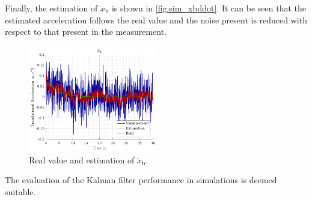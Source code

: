 Finally, the estimation of $\ddot{x}_\mathrm{b}$ is shown in \autoref{fig:sim_xbddot}. It can be seen that the estimated acceleration follows the real value and the noise present is reduced with respect to that present in the measurement.
\begin{figure}[H]
	\includegraphics[width=0.5\textwidth]{figures/sim_xbddot}
	\caption{Real value and estimation of $\ddot{x}_\mathrm{b}$.}
	\label{fig:sim_xbddot}
\end{figure}

The evaluation of the Kalman filter performance in simulations is deemed suitable. 

